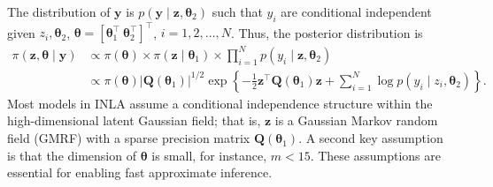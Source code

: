 The distribution of $\boldsymbol{y}$ is $p(\boldsymbol{y}\mid \boldsymbol{z},\boldsymbol{\theta}_2)$ such that $y_i$ are conditional independent given $z_i,\boldsymbol{\theta}_2$, $\boldsymbol{\theta}=[\boldsymbol{\theta}_1^{\top} \ \boldsymbol{\theta}_2^{\top}]^{\top}$, $i=1,2,\dots,N$. Thus, the posterior distribution is
\begin{align}\label{eq:INLA1}
	\pi(\boldsymbol{z},\boldsymbol{\theta}\mid \boldsymbol{y})&\propto \pi(\boldsymbol{\theta})\times \pi(\boldsymbol{z}\mid \boldsymbol{\theta}_1)\times \prod_{i=1}^{N}p(y_i\mid \boldsymbol{z},\boldsymbol{\theta}_2)\\
	&\propto \pi(\boldsymbol{\theta})|\boldsymbol{Q}(\boldsymbol{\theta}_1)|^{1/2}\exp\left\{-\frac{1}{2}\boldsymbol{z}^{\top}\boldsymbol{Q}(\boldsymbol{\theta}_1)\boldsymbol{z}+\sum_{i=1}^N\log p(y_i\mid z_i,\boldsymbol{\theta}_2)\right\}.\nonumber
\end{align}
Most models in INLA assume a conditional independence structure within the high-dimensional latent Gaussian field; that is, $\boldsymbol{z}$ is a Gaussian Markov random field (GMRF) with a sparse precision matrix $\boldsymbol{Q}(\boldsymbol{\theta}_1)$. A second key assumption is that the dimension of $\boldsymbol{\theta}$ is small, for instance, $m < 15$. These assumptions are essential for enabling fast approximate inference.

